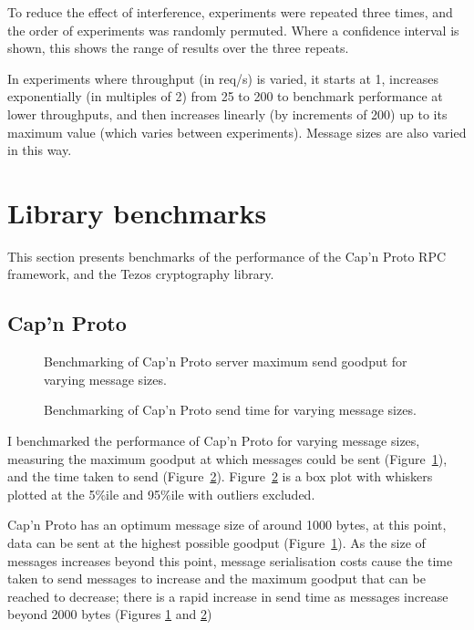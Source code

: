 To reduce the effect of interference, experiments were repeated three times, and the order of experiments was randomly permuted. Where a confidence interval is shown, this shows the range of results over the three repeats.

In experiments where throughput (in req/s) is varied, it starts at 1, increases exponentially (in multiples of 2) from 25 to 200 to benchmark performance at lower throughputs, and then increases linearly (by increments of 200) up to its maximum value (which varies between experiments). Message sizes are also varied in this way.

\section{Library benchmarks} \label{librarybenchmarks}
This section presents benchmarks of the performance of the Cap'n Proto RPC framework, and the Tezos cryptography library.

\subsection{Cap'n Proto} \label{capnpbenchmark}

\begin{figure}[h!]
\centering
\resizebox{.6\textwidth}{!}{}
\caption{Benchmarking of Cap'n Proto server maximum send goodput for varying message sizes.}
\label{sizegoodput}
\end{figure}

\begin{figure}[h!]
\centering
\resizebox{.6\textwidth}{!}{}
\caption{Benchmarking of Cap'n Proto send time for varying message sizes.}
\label{sizesendtime}
\end{figure}

I benchmarked the performance of Cap'n Proto \cite{capnp} for varying message sizes, measuring the maximum goodput at which messages could be sent (Figure~\ref{sizegoodput}), and the time taken to send (Figure~\ref{sizesendtime}). Figure~\ref{sizesendtime} is a box plot with whiskers plotted at the 5\%ile and 95\%ile with outliers excluded.

Cap'n Proto has an optimum message size of around 1000 bytes, at this point, data can be sent at the highest possible goodput (Figure~\ref{sizegoodput}). As the size of messages increases beyond this point, message serialisation costs cause the time taken to send messages to increase and the maximum goodput that can be reached to decrease; there is a rapid increase in send time as messages increase beyond 2000 bytes (Figures \ref{sizegoodput} and \ref{sizesendtime})

